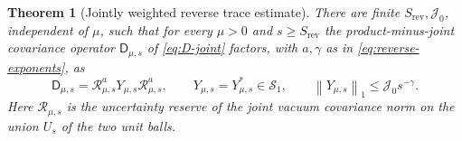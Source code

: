 \documentclass[11pt]{amsart}
\numberwithin{equation}{section}
\newtheorem{theorem}{Theorem}[section]
\theoremstyle{definition}
\newcommand{\Sc}{\mathcal S}
\newcommand{\JointRes}{\mathcal R}
\newcommand{\JointD}{\mathsf D}
\newcommand{\norm}[1]{\left\|#1\right\|}
\begin{document}
\begin{theorem}[Jointly weighted reverse trace estimate]\label{thm:reverse}
There are finite \(S_{\mathrm{rev}},\mathcal J_0\), independent of \(\mu\),
such that for every \(\mu>0\) and \(s\ge S_{\mathrm{rev}}\) the
product-minus-joint covariance operator \(\JointD_{\mu,s}\) of
\eqref{eq:D-joint} factors, with \(a,\gamma\) as in
\eqref{eq:reverse-exponents}, as
\begin{equation}
 \JointD_{\mu,s}
 =\JointRes_{\mu,s}^{a}Y_{\mu,s}\JointRes_{\mu,s}^{a},
 \qquad
 Y_{\mu,s}=Y_{\mu,s}^*\in\Sc_1,\qquad
 \norm{Y_{\mu,s}}_1\le \mathcal J_0s^{-\gamma}.
 \label{eq:reverse-trace}
\end{equation}
Here \(\JointRes_{\mu,s}\) is the uncertainty reserve of the joint
vacuum covariance norm on the union \(U_s\) of the two unit balls.
\end{theorem}
\end{document}
